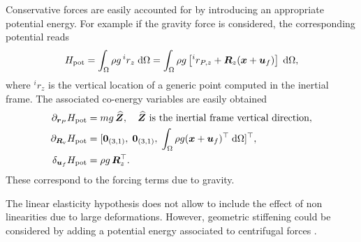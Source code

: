 \documentclass{svjour3}                     %
\begin{document}
\begin{remark}
	Conservative forces are easily accounted for by introducing an appropriate potential energy. For example if the gravity force is considered, the corresponding potential reads
	\begin{equation*}
	H_{\text{pot}} = \int_{\Omega} \rho g \, ^i r_z \d{\Omega} = \int_{\Omega} \rho g \left[ ^i r_{P, z} +\bm{R}_z (\bm{x} + \bm{u}_f) \right] \d{\Omega},
	\end{equation*}
	where $^i r_z$ is the vertical location of a generic point computed in the inertial frame. The associated co-energy variables are easily obtained
	\begin{align*}
	\partial_{\bm{r}_P}H_{\text{pot}} &= m g \, \widehat{\bm{Z}}, \quad \text{$\widehat{\bm{Z}}$ is the inertial frame vertical direction},\\
	\partial_{\bm{R}_\text{v}}H_{\text{pot}} &= [\bm{0}_{(3, 1)}, \; \bm{0}_{(3, 1)}, \; \int_{\Omega} \rho g (\bm{x} + \bm{u}_f)^\top \d{\Omega}]^\top, \\
	\delta_{\bm{u}_f} H_{\text{pot}} &= \rho g \, \bm{R}_z^\top.
	\end{align*}
	These correspond to the forcing terms due to gravity.
\end{remark}

\begin{remark}
	The linear elasticity hypothesis does not allow to include the effect of non linearities due to large deformations.  However, geometric stiffening could be considered by adding a potential energy associated to centrifugal forces \cite{MB_Daepde,YIGIT1988201}. 
\end{remark}
\end{document}
